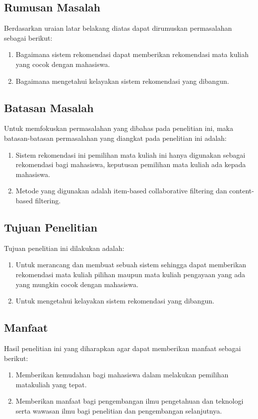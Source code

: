 \subsection{Rumusan Masalah}

Berdasarkan uraian latar belakang diatas dapat dirumuskan permasalahan sebagai berikut:
\begin{enumerate}
  \setlength\itemsep{0em}
  \item Bagaimana sistem rekomendasi dapat memberikan rekomendasi mata kuliah yang cocok dengan mahasiswa.
  \item Bagaimana mengetahui kelayakan sistem rekomendasi yang dibangun.
\end{enumerate}

\subsection{Batasan Masalah}

Untuk memfokuskan permasalahan yang dibahas pada penelitian ini, maka batasan-batasan permasalahan yang diangkat pada penelitian
ini adalah:
\begin{enumerate}
  \setlength\itemsep{0em}
  \item Sistem rekomendasi ini pemilihan mata kuliah
        ini hanya digunakan sebagai rekomendasi bagi
        mahasiswa, keputusan pemilihan mata kuliah
        ada kepada mahasiswa.
  \item Metode yang digunakan adalah item-based
        collaborative filtering dan content-based
        filtering.
\end{enumerate}

\subsection{Tujuan Penelitian}
Tujuan penelitian ini dilakukan adalah:
\begin{enumerate}
  \setlength\itemsep{0em}
  \item Untuk merancang dan membuat sebuah sistem sehingga dapat memberikan rekomendasi mata kuliah pilihan
        maupun mata kuliah pengayaan yang ada yang mungkin cocok dengan mahasiswa.
  \item Untuk
        mengetahui kelayakan sistem rekomendasi yang dibangun.
\end{enumerate}

\subsection{Manfaat}
Hasil penelitian ini yang diharapkan agar dapat memberikan manfaat sebagai berikut:
\begin{enumerate}
  \setlength\itemsep{0em}
  \item Memberikan kemudahan bagi mahasiswa dalam melakukan pemilihan matakuliah yang tepat.
  \item Memberikan manfaat bagi pengembangan ilmu pengetahuan dan teknologi serta wawasan ilmu bagi
        penelitian dan pengembangan selanjutnya.
\end{enumerate}